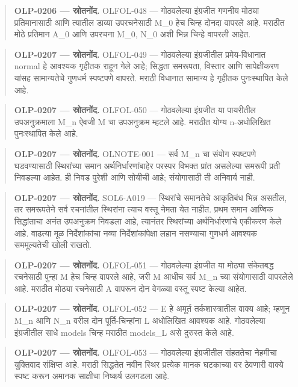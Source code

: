 \begin{quote}\small\textbf{OLP-0206 — स्रोतनोंद.} OLFOL-048 — गोठवलेल्या इंग्रजीत गणनीय मोठ्या प्रतिमानासाठी आणि त्यातील डाव्या उपरचनेसाठी M\_0 हेच चिन्ह दोनदा वापरले आहे. मराठीत मोठे प्रतिमान A\_0 आणि उपरचना M\_0, N\_0 अशी भिन्न चिन्हे वापरली आहेत.\end{quote}
\begin{quote}\small\textbf{OLP-0207 — स्रोतनोंद.} OLFOL-049 — गोठवलेल्या इंग्रजीतील प्रमेय-विधानात normal हे आवश्यक गृहीतक राहून गेले आहे; सिद्धता समरूपता, विस्तार आणि सापेक्षीकरण यांसह सामान्यतेचे गुणधर्म स्पष्टपणे वापरते. मराठी विधानात सामान्य हे गृहीतक पुनःस्थापित केले आहे.\end{quote}
\begin{quote}\small\textbf{OLP-0207 — स्रोतनोंद.} OLFOL-050 — गोठवलेल्या इंग्रजीत या पायरीतील उपअनुक्रमाला M\_n ऐवजी M चा उपअनुक्रम म्हटले आहे. मराठीत योग्य n-अधोलिखित पुनःस्थापित केले आहे.\end{quote}
\begin{quote}\small\textbf{OLP-0207 — स्रोतनोंद.} OLNOTE-001 — सर्व M\_n चा संयोग स्पष्टपणे घडवण्यासाठी स्थिरांच्या समान अर्थनिर्धारणांबाहेर परस्पर विभक्त प्रांत असलेल्या समरूपी प्रती निवडल्या आहेत. ही निवड पुरेशी आणि सोयीची आहे; संयोगासाठी ती अनिवार्य नाही.\end{quote}
\begin{quote}\small\textbf{OLP-0207 — स्रोतनोंद.} SOL6-A019 — स्थिरांचे समानतेचे आकृतिबंध भिन्न असतील, तर समरूपतेने सर्व रचनांतील स्थिरांना त्याच वस्तू नेमता येत नाहीत. प्रथम समान आण्विक सिद्धांताचा अनंत उपअनुक्रम निवडला आहे, त्यानंतर स्थिरांच्या अर्थनिर्धारणांचे एकीकरण केले आहे. वाढत्या मूळ निर्देशांकांचा नव्या निर्देशांकांपेक्षा लहान नसण्याचा गुणधर्म आवश्यक सममूल्यतेची खोली राखतो.\end{quote}
\begin{quote}\small\textbf{OLP-0207 — स्रोतनोंद.} OLFOL-051 — गोठवलेल्या इंग्रजीत या मोठ्या संकेतबद्ध रचनेसाठी पुन्हा M हेच चिन्ह वापरले आहे, जरी M आधीच सर्व M\_n च्या संयोगासाठी वापरलेले आहे. मराठीत मोठ्या रचनेसाठी A वापरून दोन वेगळ्या वस्तू स्पष्ट केल्या आहेत.\end{quote}
\begin{quote}\small\textbf{OLP-0207 — स्रोतनोंद.} OLFOL-052 — E हे अमूर्त तर्कशास्त्रातील वाक्य आहे; म्हणून M\_n आणि N\_n वरील दोन पूर्ति-चिन्हांना L अधोलिखित आवश्यक आहे. गोठवलेल्या इंग्रजीतील साधे models चिन्ह मराठीत models\_L असे दुरुस्त केले आहे.\end{quote}
\begin{quote}\small\textbf{OLP-0207 — स्रोतनोंद.} OLFOL-053 — गोठवलेल्या इंग्रजीतील संहततेचा नेहमीचा युक्तिवाद संक्षिप्त आहे. मराठी सिद्धतेत नवीन स्थिर प्रत्येक मानक घटकाच्या वर ठेवणारी वाक्ये स्पष्ट करून अमानक साक्षीचा निष्कर्ष उलगडला आहे.\end{quote}
